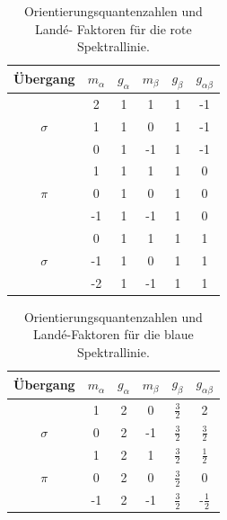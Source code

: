 \begin{table}
    \centering
    \begin{tabular}{c c c c c c}
        \toprule
        \midrule
        Übergang & $m_{\alpha}$ & $g_{\alpha}$ & $m_{\beta}$ & $g_{\beta}$ & $g_{\alpha \beta}$ \\
        \midrule
        &   2   &   1   &   1   &   1   &   -1   \\
        $\sigma$  &  1  &   1   &   0   &   1   &   -1   \\
        &   0   &   1   &   -1  &   1   &   -1   \\
        \midrule
        &   1   &   1   &   1   &   1   &   0   \\
        $\pi$   &   0   &   1   &   0   &   1   &   0   \\
        &   -1   &   1   &  -1  &   1   &   0   \\
        \midrule
        &   0   &   1   &   1   &   1   &   1  \\
        $\sigma$    &   -1  &   1   &   0   &   1   &   1   \\
        &   -2  &   1   &   -1  &   1   &   1   \\
        \bottomrule
    \end{tabular}
    \caption{Orientierungsquantenzahlen und Landé- Faktoren für die rote Spektrallinie.}
    \label{tab1}
\end{table}
\FloatBarrier
\begin{table}
    \centering
    \begin{tabular}{c c c c c c}
        \toprule
        \midrule
        Übergang    &   $m_{\alpha}$ & $g_{\alpha}$ & $m_{\beta}$ & $g_{\beta}$ & $g_{\alpha \beta}$ \\
        \midrule
        &   1   &   2   &   0   &   $\frac{3}{2}$   &   2   \\
        $\sigma$    &   0   &   2   &   -1  &   $\frac{3}{2}$   &   $\frac{3}{2}$   \\
        \midrule
        &   1   &   2   &   1   &   $\frac{3}{2}$   &   $\frac{1}{2}$   \\
        $\pi$   &   0   &   2   &   0   &   $\frac{3}{2}$   &   0   \\
        &   -1   &   2   &   -1   &   $\frac{3}{2}$   &   -$\frac{1}{2}$   \\
        \bottomrule
    \end{tabular}
    \caption{Orientierungsquantenzahlen und Landé-Faktoren für die blaue Spektrallinie.}
    \label{tab2}
\end{table}


